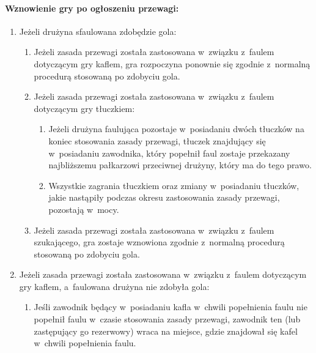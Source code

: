 \documentclass[12pt,a4paper]{article}
\begin{document}
\paragraph{Wznowienie gry po ogłoszeniu przewagi:}

\begin{enumerate}
	\item
	      Jeżeli drużyna sfaulowana zdobędzie gola:

	      \begin{enumerate}
		      \item
		            Jeżeli zasada przewagi została zastosowana w~związku z~faulem
		            dotyczącym gry kaflem, gra rozpoczyna ponownie się zgodnie z~normalną procedurą stosowaną po zdobyciu gola.
		      \item
		            Jeżeli zasada przewagi została zastosowana w~związku z~faulem
		            dotyczącym gry tłuczkiem:

		            \begin{enumerate}
			            \item
			                  Jeżeli drużyna faulująca pozostaje w~posiadaniu dwóch tłuczków na
			                  koniec stosowania zasady przewagi, tłuczek znajdujący się w~posiadaniu zawodnika, który popełnił faul zostaje przekazany
			                  najbliższemu pałkarzowi przeciwnej drużyny, który ma do tego
			                  prawo.
			            \item
			                  Wszystkie zagrania tłuczkiem oraz zmiany w~posiadaniu tłuczków, jakie nastąpiły
			                  podczas okresu zastosowania zasady przewagi, pozostają w~mocy.
		            \end{enumerate}
		      \item
		            Jeżeli zasada przewagi została zastosowana w~związku z~faulem
		            szukającego, gra zostaje wznowiona zgodnie z~normalną procedurą
		            stosowaną po zdobyciu gola.
	      \end{enumerate}
	\item
	      Jeżeli zasada przewagi została zastosowana w~związku z~faulem
	      dotyczącym gry kaflem, a~faulowana drużyna nie zdobyła gola:

	      \begin{enumerate}
		      \item
		            Jeśli zawodnik będący w~posiadaniu kafla w~chwili popełnienia faulu nie
		            popełnił faulu w~czasie stosowania zasady przewagi, zawodnik ten
		            (lub zastępujący go rezerwowy) wraca na miejsce, gdzie znajdował się
		            kafel w~chwili popełnienia faulu.


\end{enumerate}
\end{enumerate}
\end{document}
